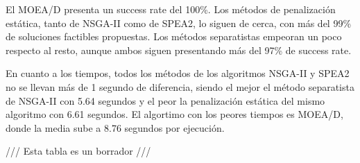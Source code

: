 El MOEA/D presenta un success rate del 100\%. Los métodos de penalización estática, tanto de NSGA-II como de SPEA2, lo siguen de cerca, con más del 99\% de soluciones factibles propuestas. Los métodos separatistas empeoran un poco respecto al resto, aunque ambos siguen presentando más del 97\% de success rate.

En cuanto a los tiempos, todos los métodos de los algoritmos NSGA-II y SPEA2 no se llevan más de 1 segundo de diferencia, siendo el mejor el método separatista de NSGA-II con 5.64 segundos y el peor la penalización estática del mismo algoritmo con 6.61 segundos. El algortimo con los peores tiempos es MOEA/D, donde la media sube a 8.76 segundos por ejecución.

\begin{center}
    {\color{red} \Large /// Esta tabla es un borrador ///}
\end{center}

\renewcommand{\arraystretch}{1.5}


